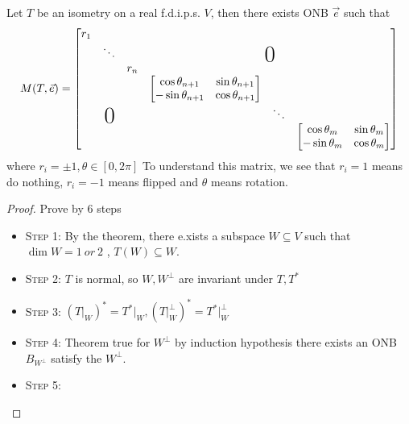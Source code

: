 \documentclass{aq-notes}
\begin{document}
    \begin{theorem}
        Let $T$ be an isometry on a real f.d.i.p.s. $V$, then there exists ONB $\vec e$ such that
        \[M(T, \vec e) = 
        \begin{bmatrix}
            \begin{matrix}
                r_1 &  &  \\
                 & \ddots & \\
                 &  & r_n
            \end{matrix} & \makebox(0,0){\text{\huge0}} \\
            \makebox(0,0){\text{\huge0}}& \begin{matrix}
                \begin{bmatrix}
                    \cos\theta_{n+1} & \sin\theta_{n+1} \\
                    -\sin\theta_{n+1} & \cos\theta_{n+1}
                \end{bmatrix} &  & \\
                 & \ddots & \\
                 &  & \begin{bmatrix}
                    \cos\theta_m & \sin\theta_m \\
                    -\sin\theta_m & \cos\theta_m
                \end{bmatrix}
            \end{matrix}
        \end{bmatrix}\]
        where $r_i = \pm 1, \theta \in [0, 2\pi]$ 
        To understand this matrix, we see that $r_i = 1$ means do nothing, 
        $r_i = -1$ means flipped and $\theta$ means rotation.
        \begin{proof}Prove by 6 steps
\begin{itemize}
        \item {\scshape Step 1}: 
                By the theorem, there e.xists a subspace $W \subseteq V$ such that $\dim W = 1\ or \ 2$ , $T(W)\subseteq W$.
        \item {\scshape Step 2}: 
                $T$ is normal, so $W, W^\perp$ are invariant under $T, T^*$
        \item {\scshape Step 3}: 
                $\displaystyle (T\vert_W)^* = T^*\vert_W, (T\vert_W^\perp)^* = T^*\vert_W^\perp$
        \item {\scshape Step 4}: 
                Theorem true for $W^\perp$ by induction hypothesis there exists an ONB $B_{W^\perp}$ satisfy the $W^\perp$.
        \item {\scshape Step 5}: 

\end{itemize}
\end{proof}
\end{theorem}
\end{document}
